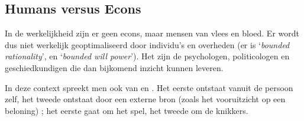 \subsection{Humans versus Econs}

In de werkelijkheid zijn er geen econs, maar mensen van vlees en bloed. Er wordt dus niet werkelijk geoptimaliseerd door individu's en overheden (er is `\textit{bounded rationality}', en `\textit{bounded will power}'). Het zijn de psychologen, politicologen en geschiedkundigen die dan bijkomend inzicht kunnen leveren.\\

\par In deze context spreekt men ook van  en . Het eerste ontstaat vanuit de persoon zelf, het tweede ontstaat door een externe bron (zoals het vooruitzicht op een beloning) ; het eerste gaat om het spel, het tweede om de knikkers.